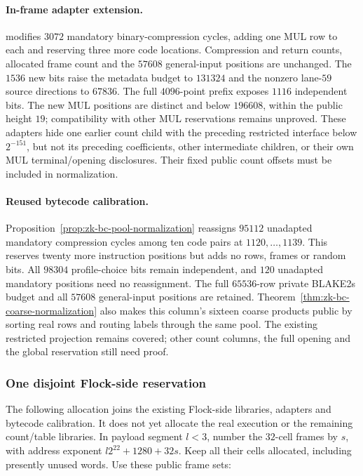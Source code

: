 \paragraph{In-frame adapter extension.}  modifies $3072$ mandatory binary-compression cycles, adding one MUL row to each and reserving three more code locations. Compression and return counts, allocated frame count and the $57608$ general-input positions are unchanged. The $1536$ new bits raise the metadata budget to $131324$ and the nonzero lane-$59$ source directions to $67836$. The full $4096$-point prefix exposes $1116$ independent bits. The new MUL positions are distinct and below $196608$, within the public height $19$; compatibility with other MUL reservations remains unproved. These adapters hide one earlier count child with the preceding restricted interface below $2^{-151}$, but not its preceding coefficients, other intermediate children, or their own MUL terminal/opening disclosures. Their fixed public count offsets must be included in normalization.

\paragraph{Reused bytecode calibration.} Proposition~\ref{prop:zk-bc-pool-normalization} reassigns $95112$ unadapted mandatory compression cycles among ten code pairs at $1120,\ldots,1139$. This reserves twenty more instruction positions but adds no rows, frames or random bits. All $98304$ profile-choice bits remain independent, and $120$ unadapted mandatory positions need no reassignment. The full $65536$-row private BLAKE2s budget and all $57608$ general-input positions are retained. Theorem~\ref{thm:zk-bc-coarse-normalization} also makes this column's sixteen coarse products public by sorting real rows and routing labels through the same pool. The existing restricted projection remains covered; other count columns, the full opening and the global reservation still need proof.

\subsubsection{One disjoint Flock-side reservation}\label{sec:zk-flock-reservation}

The following allocation joins the existing Flock-side libraries, adapters and bytecode calibration. It does not yet allocate the real execution or the remaining count/table libraries. In payload segment $l<3$, number the $32$-cell frames by $s$, with address exponent $l2^{22}+1280+32s$. Keep all their cells allocated, including presently unused words. Use these public frame sets:

